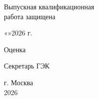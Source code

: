 \documentclass[a4paper,14pt]{extarticle}
\begin{document}
\begin{titlepage}
\begin{flushright}
\begin{minipage}{0.46\textwidth}
Выпускная квалификационная\\
работа защищена

\vspace{0.15cm}

«\underline{\hspace{0.8cm}}»\underline{\hspace{2.5cm}}2026 г.

\vspace{0.18cm}

Оценка

\vspace{0.12cm}

\underline{\hspace{3.0cm}}

\vspace{0.18cm}

Секретарь ГЭК \underline{\hspace{2.2cm}}
\end{minipage}
\end{flushright}

\vfill

\begin{center}
г. Москва\\
2026
\end{center}
\end{titlepage}
\end{document}
